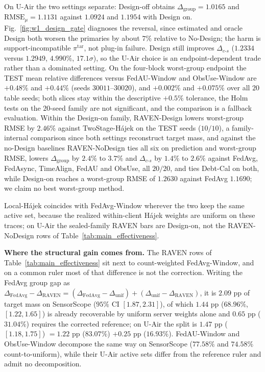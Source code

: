 \documentclass[letterpaper,journal]{IEEEtran}
\begin{document}
On U-Air the two settings separate: Design-off obtains
$\Delta_{\mathrm{group}}=1.0165$ and $\mathrm{RMSE}_{\mu}=1.1131$ against
$1.0924$ and $1.1954$ with Design on.  Fig.~\ref{fig:w1_design_gate} diagnoses
the reversal, since estimated and oracle Design both worsen the primaries by
about $7\%$ relative to No-Design; the harm is support-incompatible
$\pi^{\mathrm{tar}}$, not plug-in failure.  Design still improves
$\Delta_{c\text{-}s}$ ($1.2334$ versus $1.2949$, $4.990\%$, $17.1\sigma$), so the
U-Air choice is an endpoint-dependent trade rather than a dominated setting.  On
the four-block worst-group endpoint the TEST mean relative differences versus
FedAU-Window and ObsUse-Window are $+0.48\%$ and $+0.44\%$ (seeds
$30011$--$30020$), and $+0.002\%$ and $+0.075\%$ over all $20$ table seeds; both
slices stay within the descriptive $+0.5\%$ tolerance, the Holm tests on the
$20$-seed family are not significant, and the comparison is a fallback
evaluation.  Within the Design-on family,
RAVEN-Design lowers worst-group RMSE by $2.46\%$ against TwoStage-H\'ajek on the
TEST seeds ($10/10$), a family-internal comparison since both settings
reconstruct target mass, and against the no-Design baselines RAVEN-NoDesign ties
all six on prediction and worst-group RMSE, lowers $\Delta_{\mathrm{group}}$ by
$2.4\%$ to $3.7\%$ and $\Delta_{c\text{-}s}$ by $1.4\%$ to $2.6\%$ against
FedAvg, FedAsync, TimeAlign, FedAU and ObsUse, all $20/20$, and ties Debt-Cal on
both, while Design-on reaches a worst-group RMSE of $1.2630$ against FedAvg
$1.1690$; we claim no best worst-group method.

Local-H\'ajek coincides with FedAvg-Window wherever the two keep the same active
set, because the realized within-client H\'ajek weights are uniform on these
traces; on U-Air the sealed-family RAVEN bars are Design-on, not the
RAVEN-NoDesign rows of Table~\ref{tab:main_effectiveness}.

\noindent\textbf{Where the structural gain comes from.}
The RAVEN rows of Table~\ref{tab:main_effectiveness} sit next to count-weighted
FedAvg-Window, and on a common ruler most of that difference is not the
correction.  Writing the FedAvg group gap as
$\Delta_{\mathrm{FedAvg}}-\Delta_{\mathrm{RAVEN}}
=(\Delta_{\mathrm{FedAvg}}-\Delta_{\mathrm{unif}})
+(\Delta_{\mathrm{unif}}-\Delta_{\mathrm{RAVEN}})$, it is $2.09$ pp of target
mass on SensorScope ($95\%$ CI $[1.87,2.31]$), of which $1.44$ pp
($68.96\%$, $[1.22,1.65]$) is already recoverable by uniform server weights
alone and $0.65$ pp ($31.04\%$) requires the corrected reference; on U-Air the
split is $1.47$ pp ($[1.18,1.75]$) $=1.22$ pp ($83.07\%$) $+0.25$ pp
($16.93\%$).  FedAU-Window and ObsUse-Window decompose the same way on
SensorScope ($77.58\%$ and $74.58\%$ count-to-uniform), while their U-Air active
sets differ from the reference ruler and admit no decomposition.
\end{document}
